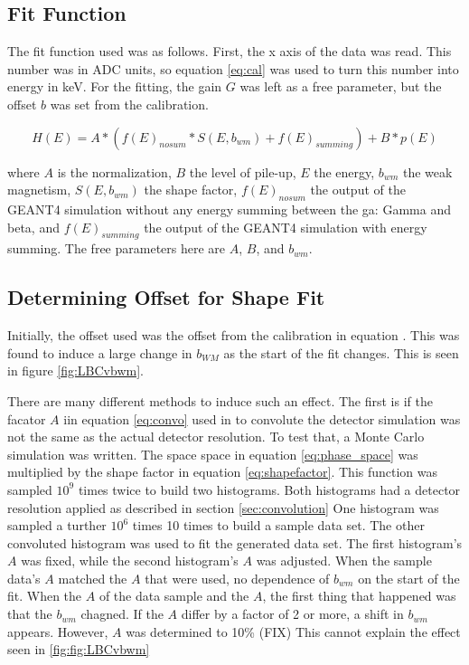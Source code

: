 \subsection{Fit Function}
The fit function used was as follows.
First, the x axis of the data was read.
This number was in ADC units, so equation \ref{eq:cal} was used to turn this number into energy in keV.
For the fitting, the gain $G$ was left as a free parameter, but the offset $b$ was set from the calibration.

\begin{equation}
	H(E) = A * (f(E)_{nosum} * S(E,b_{wm}) + f(E)_{summing}) + B*p(E)
	\label{eq:betafit}
\end{equation}

where $A$ is the normalization, $B$ the level of pile-up, $E$ the energy, $b_{wm}$ the weak magnetism, $S(E,b_{wm})$ the shape factor, $f(E)_{nosum}$ the output of the GEANT4 simulation without any energy summing between the ga:
Gamma and beta, and $f(E)_{summing}$ the output of the GEANT4 simulation with energy summing.
The free parameters here are $A$, $B$, and $b_{wm}$.

\subsection{Determining Offset for Shape Fit}

Initially, the offset used was the offset from the calibration  in equation \label{eq:cal}.
This was found to induce a large change in $b_{WM}$ as the start of the fit changes. 
This is seen in figure \ref{fig:LBCvbwm}.


There are many different methods to induce such an effect.
The first is if the facator $A$ iin equation \ref{eq:convo} used in to convolute the detector simulation was not the same as the actual detector resolution.
To test that, a Monte Carlo simulation was written.
The space space in equation \ref{eq:phase_space} was multiplied by the shape factor in equation \ref{eq:shapefactor}.
This function was sampled $10^{9}$ times twice to build two histograms. 
Both histograms had a detector resolution applied as described in section \ref{sec:convolution}
One histogram was sampled a turther $10^{6}$ times 10 times to build a sample data set.
The other convoluted histogram was used to fit the generated data set.
The first histogram's $A$ was fixed, while the second histogram's $A$ was adjusted.
When the sample data's $A$ matched the $A$ that were used, no dependence of $b_{wm}$ on the start of the fit.
When the $A$ of the data sample and the $A$, the first thing that happened was that the $b_{wm}$ chagned.
If the $A$ differ by a factor of 2 or more, a shift in $b_{wm}$ appears.
However, $A$ was determined to 10\% (FIX)
This cannot explain the effect seen in \ref{fig:fig:LBCvbwm}


